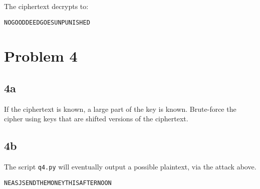 \documentclass[letterpaper, 12pt]{article}
\begin{document}
The ciphertext decrypts to:
\begin{Verbatim}[frame=single]
NOGOODDEEDGOESUNPUNISHED
\end{Verbatim}

\section*{Problem 4}

\subsection*{4a}

If the ciphertext is known, a large part of the key is known. Brute-force the cipher using keys that are shifted versions of the ciphertext.

\subsection*{4b}

The script \texttt{q4.py} will eventually output a possible plaintext, via the attack above.

\begin{Verbatim}[frame=single]
NEASJSENDTHEMONEYTHISAFTERNOON
\end{Verbatim}
\end{document}
